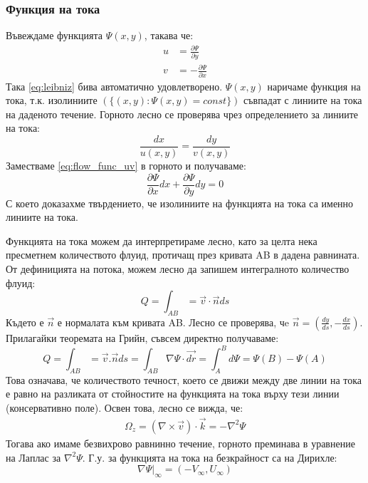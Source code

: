 \subsubsection{Функция на тока}
Въвеждаме функцията $\Psi(x,y)$, такава че:
\begin{align}
	\label{eq:flow_func_uv}
	u & = \frac{\partial \Psi}{\partial y}            \\
	v & = -\frac{\partial \Psi}{\partial x} \nonumber
\end{align}
Така \autoref{eq:leibniz} бива автоматично удовлетворено. $\Psi(x,y)$ наричаме функция на тока, т.к. изолиниите $\left(\{(x,y): \Psi(x,y) = const\}\right)$ съвпадат с линиите на тока на даденото течение.
Горното лесно се проверява чрез определението за линиите на тока:
\begin{equation*}
	\frac{dx}{u(x,y)} = \frac{dy}{v(x,y)}
\end{equation*}
Заместваме \autoref{eq:flow_func_uv} в горното и получаваме:
\begin{equation*}
	\frac{\partial \Psi}{\partial x} d x + \frac{\partial \Psi}{\partial y} d y = 0
\end{equation*}
С което доказахме твърдението, че изолиниите на функцията на тока са именно линиите на тока.

Функцията на тока можем да интерпретираме лесно, като за целта нека пресметнем количеството флуид, протичащ през кривата AB в дадена равнината. От дефиницията на потока, можем лесно да запишем интегралното количество флуид:
\begin{equation*}
	Q = \int_{AB} = \vec{v} \cdot \vec{n} ds
\end{equation*}
Където е $\vec{n}$ е нормалата към кривата AB. Лесно се проверява, чe $\vec{n} = (\frac{dy}{ds}, -\frac{d x}{d s})$. Прилагайки теоремата на Грийн, съвсем директно получаваме:
\begin{equation}
	Q = \int_{AB} = \vec{v}.\vec{n} ds = \int_{AB} \nabla \Psi \cdot \vec{dr} = \int_{A}^{B} d \Psi = \Psi(B) - \Psi(A)
\end{equation}
Това означава, че количеството течност, което се движи между две линии на тока е равно на разликата от стойностите на функцията на тока върху тези линии (консервативно поле).
Освен това, лесно се вижда, че:
\begin{align*}
	\Omega_z = (\nabla \times \vec{v}) \cdot \vec{k} = - \nabla^2 \Psi
\end{align*}
Тогава ако имаме безвихрово равнинно течение, горното преминава в уравнение на Лаплас за $\nabla^2 \Psi$.
Г.у. за функцията на тока на безкрайност са на Дирихле:
\begin{equation*}
	\nabla \Psi \big|_\infty = (-V_\infty, U_\infty)
\end{equation*}

